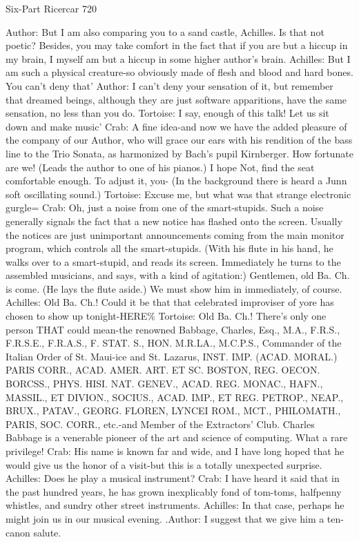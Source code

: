 Six-Part Ricercar                                                                       720

Author: But I am also comparing you to a sand castle, Achilles. Is that not poetic?
  Besides, you may take comfort in the fact that if you are but a hiccup in my brain, I
  myself am but a hiccup in some higher author's brain.
Achilles: But I am such a physical creature-so obviously made of flesh and blood and
  hard bones. You can't deny that'
Author: I can't deny your sensation of it, but remember that dreamed beings, although
  they are just software apparitions, have the same sensation, no less than you do.
Tortoise: I say, enough of this talk! Let us sit down and make music'
Crab: A fine idea-and now we have the added pleasure of the company of our Author,
  who will grace our ears with his rendition of the bass line to the Trio Sonata, as
  harmonized by Bach's pupil Kirnberger. How fortunate are we! (Leads the author to
  one of his pianos.) I hope Not, find the seat comfortable enough. To adjust it, you- (In
  the background there is heard a Junn~ soft oscillating sound.)
Tortoise: Excuse me, but what was that strange electronic gurgle=
Crab: Oh, just a noise from one of the smart-stupids. Such a noise generally signals the
  fact that a new notice has flashed onto the screen. Usually the notices are just
  unimportant announcements coming from the main monitor program, which controls
  all the smart-stupids. (With his flute in his hand, he walks over to a smart-stupid, and
  reads its screen. Immediately he turns to the assembled musicians, and says, with a
  kind of agitation:) Gentlemen, old Ba. Ch. is come. (He lays the flute aside.) We must
  show him in immediately, of course.
Achilles: Old Ba. Ch.! Could it be that that celebrated improviser of yore has chosen to
  show up tonight-HERE\%
Tortoise: Old Ba. Ch.! There's only one person THAT could mean-the renowned
  Babbage, Charles, Esq., M.A., F.R.S., F.R.S.E., F.R.A.S., F. STAT. S., HON.
  M.R.LA., M.C.P.S., Commander of the Italian Order of St. Maui-ice and St. Lazarus,
  INST. IMP. (ACAD. MORAL.) PARIS CORR., ACAD. AMER. ART. ET SC.
  BOSTON, REG. OECON. BORCSS., PHYS. HISI. NAT. GENEV., ACAD. REG.
  MONAC., HAFN., MASSIL., ET DIVION., SOCIUS., ACAD. IMP., ET REG.
  PETROP., NEAP., BRUX., PATAV., GEORG. FLOREN, LYNCEI ROM., MCT.,
  PHILOMATH., PARIS, SOC. CORR., etc.-and Member of the Extractors' Club.
  Charles Babbage is a venerable pioneer of the art and science of computing. What a
  rare privilege!
Crab: His name is known far and wide, and I have long hoped that he would give us the
  honor of a visit-but this is a totally unexpected surprise.
Achilles: Does he play a musical instrument?
Crab: I have heard it said that in the past hundred years, he has grown inexplicably fond
  of tom-toms, halfpenny whistles, and sundry other street instruments.
Achilles: In that case, perhaps he might join us in our musical evening. .Author: I suggest
  that we give him a ten-canon salute.




